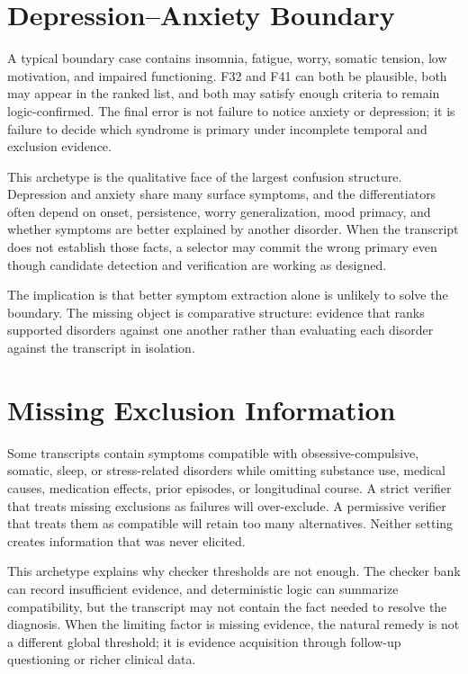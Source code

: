 \section{Depression--Anxiety Boundary}

A typical boundary case contains insomnia, fatigue, worry, somatic tension, low motivation, and impaired functioning. F32 and F41 can both be plausible, both may appear in the ranked list, and both may satisfy enough criteria to remain logic-confirmed. The final error is not failure to notice anxiety or depression; it is failure to decide which syndrome is primary under incomplete temporal and exclusion evidence.

This archetype is the qualitative face of the largest confusion structure. Depression and anxiety share many surface symptoms, and the differentiators often depend on onset, persistence, worry generalization, mood primacy, and whether symptoms are better explained by another disorder. When the transcript does not establish those facts, a selector may commit the wrong primary even though candidate detection and verification are working as designed.

The implication is that better symptom extraction alone is unlikely to solve the boundary. The missing object is comparative structure: evidence that ranks supported disorders against one another rather than evaluating each disorder against the transcript in isolation.

\section{Missing Exclusion Information}

Some transcripts contain symptoms compatible with obsessive-compulsive, somatic, sleep, or stress-related disorders while omitting substance use, medical causes, medication effects, prior episodes, or longitudinal course. A strict verifier that treats missing exclusions as failures will over-exclude. A permissive verifier that treats them as compatible will retain too many alternatives. Neither setting creates information that was never elicited.

This archetype explains why checker thresholds are not enough. The checker bank can record insufficient evidence, and deterministic logic can summarize compatibility, but the transcript may not contain the fact needed to resolve the diagnosis. When the limiting factor is missing evidence, the natural remedy is not a different global threshold; it is evidence acquisition through follow-up questioning or richer clinical data.


